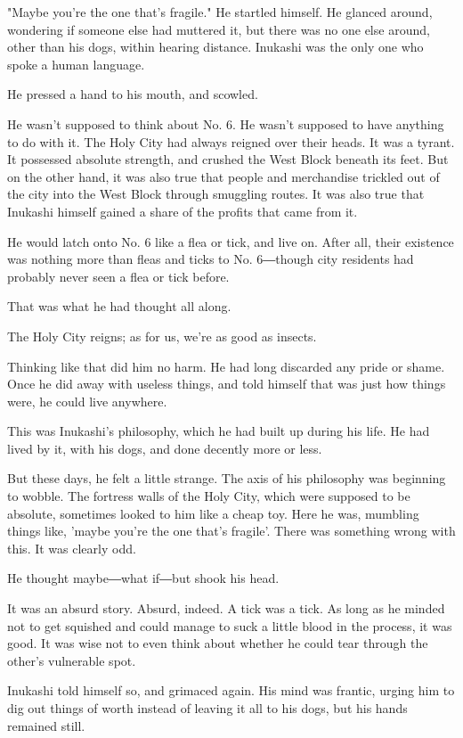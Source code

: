 "Maybe you're the one that's fragile." He startled himself. He glanced
around, wondering if someone else had muttered it, but there was no one
else around, other than his dogs, within hearing distance. Inukashi was
the only one who spoke a human language.

He pressed a hand to his mouth, and scowled.

He wasn't supposed to think about No. 6. He wasn't supposed to have
anything to do with it. The Holy City had always reigned over their
heads. It was a tyrant. It possessed absolute strength, and crushed the
West Block beneath its feet. But on the other hand, it was also true
that people and merchandise trickled out of the city into the West Block
through smuggling routes. It was also true that Inukashi himself gained
a share of the profits that came from it.

He would latch onto No. 6 like a flea or tick, and live on. After all,
their existence was nothing more than fleas and ticks to No. 6―though
city residents had probably never seen a flea or tick before.

That was what he had thought all along.

The Holy City reigns; as for us, we're as good as insects.

Thinking like that did him no harm. He had long discarded any pride or
shame. Once he did away with useless things, and told himself that was
just how things were, he could live anywhere.

This was Inukashi's philosophy, which he had built up during his life.
He had lived by it, with his dogs, and done decently more or less.

But these days, he felt a little strange. The axis of his philosophy was
beginning to wobble. The fortress walls of the Holy City, which were
supposed to be absolute, sometimes looked to him like a cheap toy. Here
he was, mumbling things like, 'maybe you're the one that's fragile'.
There was something wrong with this. It was clearly odd.

He thought maybe―what if―but shook his head.

It was an absurd story. Absurd, indeed. A tick was a tick. As long as he
minded not to get squished and could manage to suck a little blood in
the process, it was good. It was wise not to even think about whether he
could tear through the other's vulnerable spot.

Inukashi told himself so, and grimaced again. His mind was frantic,
urging him to dig out things of worth instead of leaving it all to his
dogs, but his hands remained still.

